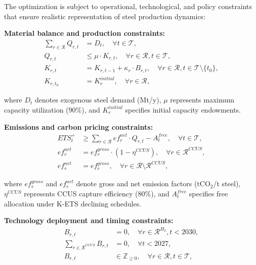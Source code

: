\documentclass[preprint,1p,authoryear]{elsarticle}
\begin{document}
The optimization is subject to operational, technological, and policy constraints that ensure realistic representation of steel production dynamics:

\textbf{Material balance and production constraints:}
\begin{align}
\sum_{r \in \mathcal{R}} Q_{r,t} &= D_t, \quad \forall t \in \mathcal{T}, \label{eq:demand}\\
Q_{r,t} &\le \mu \cdot K_{r,t}, \quad \forall r \in \mathcal{R}, t \in \mathcal{T}, \label{eq:utilization}\\
K_{r,t} &= K_{r,t-1} + \kappa_r \cdot B_{r,t}, \quad \forall r \in \mathcal{R}, t \in \mathcal{T} \setminus \{t_0\}, \label{eq:capacity}\\
K_{r,t_0} &= K_r^{initial}, \quad \forall r \in \mathcal{R}, \label{eq:initial}
\end{align}

where $D_t$ denotes exogenous steel demand (Mt/y), $\mu$ represents maximum capacity utilization (90\%), and $K_r^{initial}$ specifies initial capacity endowments.

\textbf{Emissions and carbon pricing constraints:}
\begin{align}
ETS_t^+ &\ge \sum_{r \in \mathcal{R}} ef_r^{net} \cdot Q_{r,t} - A_t^{free}, \quad \forall t \in \mathcal{T}, \label{eq:ets_balance}\\
ef_r^{net} &= ef_r^{gross} \cdot (1 - \eta^{CCUS}), \quad \forall r \in \mathcal{R}^{CCUS}, \label{eq:ccus_factor}\\
ef_r^{net} &= ef_r^{gross}, \quad \forall r \in \mathcal{R} \setminus \mathcal{R}^{CCUS}, \label{eq:no_ccus}
\end{align}

where $ef_r^{gross}$ and $ef_r^{net}$ denote gross and net emission factors (tCO$_2$/t steel), $\eta^{CCUS}$ represents CCUS capture efficiency (80\%), and $A_t^{free}$ specifies free allocation under K-ETS declining schedules.

\textbf{Technology deployment and timing constraints:}
\begin{align}
B_{r,t} &= 0, \quad \forall r \in \mathcal{R}^{H_2}, t < 2030, \label{eq:h2_timing}\\
\sum_{r \in \mathcal{R}^{CCUS}} B_{r,t} &= 0, \quad \forall t < 2027, \label{eq:ccus_timing}\\
B_{r,t} &\in \mathbb{Z}_{\ge 0}, \quad \forall r \in \mathcal{R}, t \in \mathcal{T}, \label{eq:integer}
\end{align}
\end{document}
